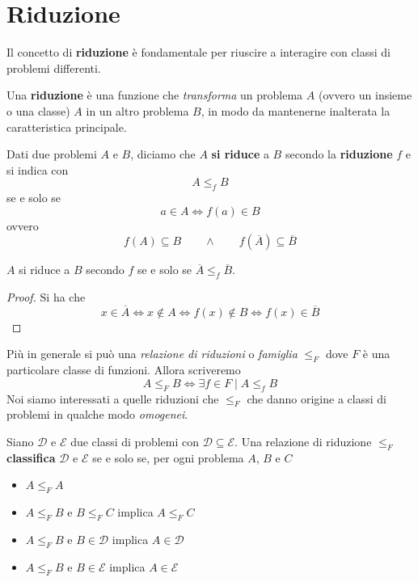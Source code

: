 \section{Riduzione}
Il concetto di \textbf{riduzione} è fondamentale per riuscire
a interagire con classi di problemi differenti.

Una \textbf{riduzione} è una funzione che \emph{transforma}
un problema $A$ (ovvero un insieme o una classe) $A$ in un
altro problema $B$, in modo da mantenerne inalterata la
caratteristica principale.

\begin{definition}
	Dati due problemi $A$ e $B$, diciamo che $A$ \textbf{si riduce}
	a $B$ secondo la \textbf{riduzione} $f$ e si indica con
	\[ A \leq_f B \]
	se e solo se
	\[ a \in A \iff f(a) \in B \]
	ovvero
	\[
		f(A) \subseteq B \qquad \land
		\qquad f(\overline{A}) \subseteq \overline{B}
	\]
\end{definition}

\begin{property}
	$A$ si riduce a $B$ secondo $f$ se e solo se
	$\overline{A} \leq_f \overline{B}$.
	\begin{proof}
		Si ha che
		\[
			x \in \overline{A} \iff x \notin A \iff
			f(x) \notin B \iff f(x) \in \overline{B}
		\]
	\end{proof}
\end{property}

Più in generale si può una \emph{relazione di riduzioni} o
\emph{famiglia} $\leq_F$ dove $F$ è una particolare classe di
funzioni. Allora scriveremo
\[ A \leq_F B \iff \exists f \in F \mid A \leq_f B \]
Noi siamo interessati a quelle riduzioni che $\leq_F$ che danno
origine a classi di problemi in qualche modo \emph{omogenei}.

\begin{definition}
	Siano $\mathcal{D}$ e $\mathcal{E}$ due classi di problemi
	con $\mathcal{D} \subseteq \mathcal{E}$. Una relazione di
	riduzione $\leq_F$ \textbf{classifica} $\mathcal{D}$ e
	$\mathcal{E}$ se e solo se, per ogni problema $A$, $B$ e $C$
	\begin{itemize}
		\item $A \leq_F A$
		\item $A \leq_F B$ e $B \leq_F C$ implica $A \leq_F C$
		\item $A \leq_F B$ e $B \in \mathcal{D}$ implica
		      $A \in \mathcal{D}$
		\item $A \leq_F B$ e $B \in \mathcal{E}$ implica
		      $A \in \mathcal{E}$
	\end{itemize}
\end{definition}

